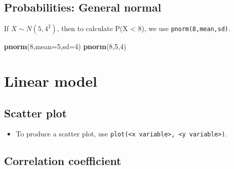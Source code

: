 \documentclass[]{article}
\newenvironment{Shaded}{\begin{snugshade}}{\end{snugshade}}
\newcommand{\DataTypeTok}[1]{\textcolor[rgb]{0.13,0.29,0.53}{#1}}
\newcommand{\DecValTok}[1]{\textcolor[rgb]{0.00,0.00,0.81}{#1}}
\newcommand{\KeywordTok}[1]{\textcolor[rgb]{0.13,0.29,0.53}{\textbf{#1}}}
\newcommand{\NormalTok}[1]{#1}
\newcommand{\OperatorTok}[1]{\textcolor[rgb]{0.81,0.36,0.00}{\textbf{#1}}}
\newcommand{\StringTok}[1]{\textcolor[rgb]{0.31,0.60,0.02}{#1}}
\providecommand{\tightlist}{%
  \setlength{\itemsep}{0pt}\setlength{\parskip}{0pt}}
\begin{document}
\hypertarget{probabilities-general-normal}{%
\subsection{Probabilities: General normal}\label{probabilities-general-normal}}

If \(X \sim N(5, 4^2)\), then to calculate P(X \textless{} 8), we use \texttt{pnorm(8,mean,sd)}.

\begin{Shaded}
\begin{Highlighting}[]
\KeywordTok{pnorm}\NormalTok{(}\DecValTok{8}\NormalTok{,}\DataTypeTok{mean=}\DecValTok{5}\NormalTok{,}\DataTypeTok{sd=}\DecValTok{4}\NormalTok{)}
\KeywordTok{pnorm}\NormalTok{(}\DecValTok{8}\NormalTok{,}\DecValTok{5}\NormalTok{,}\DecValTok{4}\NormalTok{)}
\end{Highlighting}
\end{Shaded}

\hypertarget{linearmodel}{%
\section{Linear model}\label{linearmodel}}

\hypertarget{scatter-plot}{%
\subsection{Scatter plot}\label{scatter-plot}}

\begin{itemize}
\tightlist
\item
  To produce a scatter plot, use \texttt{plot(\textless{}x\ variable\textgreater{},\ \textless{}y\ variable\textgreater{})}.
\end{itemize}

\begin{Shaded}
\end{Shaded}

\hypertarget{correlation-coefficient}{%
\subsection{Correlation coefficient}\label{correlation-coefficient}}
\end{document}
